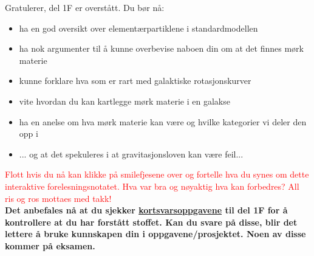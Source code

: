 \documentclass{beamer}
\let\hrefori\href
\renewcommand{\href}[2]{{\setlength{\fboxsep}{1pt}\colorbox{sunset}{\hrefori{#1}{#2}}}}
\newcommand{\pagebutton}[1]{\setbeamertemplate{button}{\tikz\node[inner xsep = 5pt, draw = structure!90, fill = green(ryb), rounded corners = 8pt]{\color{amber}\Large\insertbuttontext};}\beamerbutton{#1}}
\begin{document}
\begin{frame}
{

{\pagebutton{\small Forrige side}}\href{https://nettskjema.no/a/160341}{ \Changey[1][yellow]{-2}}
Gratulerer, del 1F er overstått. Du bør nå:
\begin{itemize}
\item ha en god oversikt over elementærpartiklene i standardmodellen
\item ha nok argumenter til å kunne overbevise naboen din om at det finnes mørk materie
\item kunne forklare hva som er rart med galaktiske rotasjonskurver
\item vite hvordan du kan kartlegge mørk materie i en galakse
\item ha en anelse om hva mørk materie kan være og hvilke kategorier vi deler den opp i
\item ... og at det spekuleres i at gravitasjonsloven kan være feil...
\end{itemize}
\textcolor{red}{Flott hvis du nå kan klikke på smilefjesene over og fortelle hva du synes om dette interaktive forelesningsnotatet. Hva var bra og nøyaktig hva kan forbedres? All ris og ros mottaes med takk!}\\
{\bf Det anbefales nå at du sjekker \href{https://www.uio.no/studier/emner/matnat/astro/AST2000/h21/undervisningsmateriell/kortsvarsoppgaver/del1f.pdf}{kortsvarsoppgavene} til del 1F for å kontrollere at du har forstått stoffet. Kan du svare på disse, blir det lettere å bruke kunnskapen din i oppgavene/prosjektet. Noen av disse kommer på eksamen.}
}



\end{frame}
\end{document}
